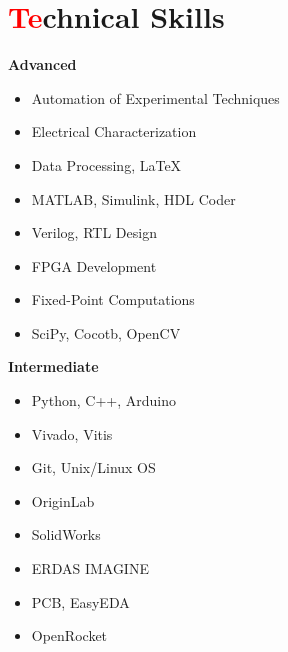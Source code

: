 \documentclass[a4paper,11pt]{article}
\newcommand{\resumesection}[2]{\section{\textcolor{red}{#1}#2}}
\begin{document}
\resumesection{Te}{chnical Skills}
{\centering
    \begin{minipage}[t]{0.45\textwidth}
        \textbf{Advanced}
        \begin{itemize}
            \item Automation of Experimental Techniques
            \item Electrical Characterization
            \item Data Processing, LaTeX
            \item MATLAB, Simulink, HDL Coder
            \item Verilog, RTL Design
            \item FPGA Development
            \item Fixed-Point Computations
            \item SciPy, Cocotb, OpenCV
        \end{itemize}
    \end{minipage}%
    \hfill
    \begin{minipage}[t]{0.45\textwidth}
        \textbf{Intermediate}
        \begin{itemize}
            \item Python, C++, Arduino
            \item Vivado, Vitis
            \item Git, Unix/Linux OS
            \item OriginLab
            \item SolidWorks
            \item ERDAS IMAGINE
            \item PCB, EasyEDA
            \item OpenRocket
        \end{itemize}
    \end{minipage}
\par}
\end{document}
